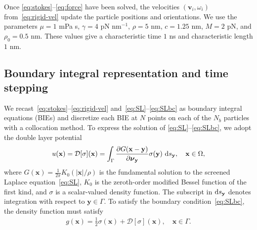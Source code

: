 \documentclass[prb,preprint,showpacs,preprintnumbers,amsmath,amssymb,longbibliography]{revtex4-1}
\newcommand{\DD}{\mathcal{D}}
\newcommand{\nnu}{\boldsymbol{\nu}}
\newcommand{\xx}{\mathbf{x}}
\renewcommand{\vv}{\mathbf{v}}
\newcommand{\yy}{\mathbf{y}}
\newcommand{\pderiv}[2]{\frac{\partial #1}{\partial #2}}
\begin{document}
Once \eqref{eq:stokes}--\eqref{eq:force} have been solved, the
velocities $(\vv_i, \omega_i)$ from~\eqref{eq:rigid-vel} update the
particle positions and orientations.  We use the parameters $\mu = 1$
mPa s, $\gamma = 4$ pN nm$^{-1}$, $\rho = 5$ nm, $c = 1.25$ nm, $M = 2$
pN, and $\rho_0 = 0.5$ nm.  These values give a characteristic time $1$
ns and characteristic length $1$ nm.

\subsection{Boundary integral representation and time stepping}
We recast~\eqref{eq:stokes}--\eqref{eq:rigid-vel}
and~\eqref{eq:SL}--\eqref{eq:SLbc} as boundary integral equations (BIEs)
and discretize each BIE at $N$ points on each of the $N_b$ particles
with a collocation method. To express the solution of
\eqref{eq:SL}--\eqref{eq:SLbc}, we adopt the double layer potential
\begin{align}
\label{eq:SL_BIE}
u({\xx}) = \DD[\sigma](\xx) = \int_\Gamma 
  \pderiv{G(\xx-\yy)}{\nnu_\yy}\sigma(\yy)\, \dif s_\yy, 
  \quad \xx \in \Omega,
\end{align}
where $G(\xx) = \frac{1}{2\pi}K_0(|\xx|/\rho)$ is the fundamental
solution to the screened Laplace equation~\eqref{eq:SL}, $K_0$ is the
zeroth-order modified Bessel function of the first kind, and $\sigma$ is
a scalar-valued density function. The subscript in $\dif s_\yy$ denotes
integration with respect to $\yy \in \Gamma$. To satisfy the boundary
condition~\eqref{eq:SLbc}, the density function must satisfy
\begin{align}
  \label{eq:SL_BIE2}
  g(\xx) = \frac{1}{2} \sigma(\xx) + \DD[\sigma](\xx), \quad
    \xx \in \Gamma.
\end{align}
\end{document}
